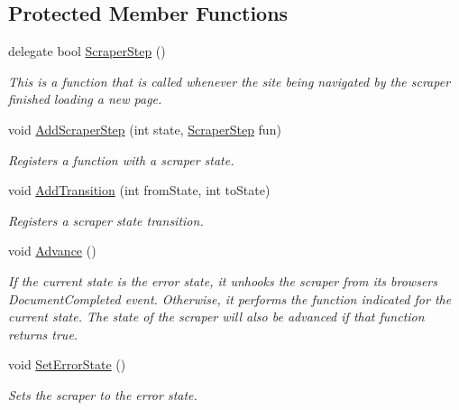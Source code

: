 \subsection*{Protected Member Functions}
\begin{DoxyCompactItemize}
\item 
delegate bool \hyperlink{class_login_scrape_1_1_scraper_ae0fba0647c6e6cc40496a7beda2059db}{Scraper\+Step} ()
\begin{DoxyCompactList}\small\item\em This is a function that is called whenever the site being navigated by the scraper finished loading a new page. \end{DoxyCompactList}\item 
void \hyperlink{class_login_scrape_1_1_scraper_a9b55b5146c6ea2c920e86f05be8b55ac}{Add\+Scraper\+Step} (int state, \hyperlink{class_login_scrape_1_1_scraper_ae0fba0647c6e6cc40496a7beda2059db}{Scraper\+Step} fun)
\begin{DoxyCompactList}\small\item\em Registers a function with a scraper state. \end{DoxyCompactList}\item 
void \hyperlink{class_login_scrape_1_1_scraper_a2f6a2da9e29aa031bc9c99895b73a6d2}{Add\+Transition} (int from\+State, int to\+State)
\begin{DoxyCompactList}\small\item\em Registers a scraper state transition. \end{DoxyCompactList}\item 
void \hyperlink{class_login_scrape_1_1_scraper_a101712d2bcbc483cbca2e18a42d14971}{Advance} ()
\begin{DoxyCompactList}\small\item\em If the current state is the error state, it unhooks the scraper from its browser\textquotesingle{}s Document\+Completed event. Otherwise, it performs the function indicated for the current state. The state of the scraper will also be advanced if that function returns true. \end{DoxyCompactList}\item 
void \hyperlink{class_login_scrape_1_1_scraper_a58ba947ea3a7753ad5077e701b84afb0}{Set\+Error\+State} ()
\begin{DoxyCompactList}\small\item\em Sets the scraper to the error state. \end{DoxyCompactList}\end{DoxyCompactItemize}
